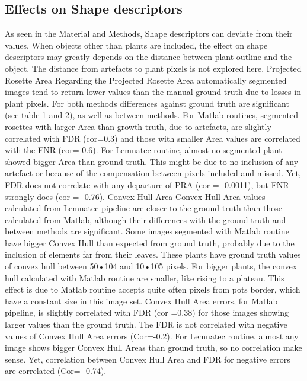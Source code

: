 \documentclass{frontiersSCNS} %
\begin{document}
\subsection{Effects on Shape descriptors}
As seen in the Material and Methods, Shape descriptors can deviate from their values. When objects other than plants are included, the effect on shape descriptors may greatly depends on the distance between plant outline and the object. The distance from artefacts to plant pixels is not explored here.
Projected Rosette Area
Regarding the Projected Rosette Area automatically segmented images tend to return lower values than the manual ground truth due to losses in plant pixels. For both methods differences against ground truth are significant (see table 1 and 2), as well as between methods. 
For Matlab routines, segmented rosettes with larger Area than growth truth, due to artefacts, are slightly correlated with FDR (cor=0.3) and those with smaller Area values are correlated with the FNR (cor=-0.6). For Lemnatec routine, almost no segmented plant showed bigger Area than ground truth. This might be due to no inclusion of any artefact or because of the compensation between pixels included and missed. Yet, FDR does not correlate with any departure of PRA (cor = -0.0011), but FNR strongly does (cor = -0.76).
Convex Hull Area
Convex Hull Area values calculated from Lemnatec pipeline are closer to the ground truth than those calculated from Matlab, although their differences with the ground truth and between methods are significant.
 Some images segmented with Matlab routine have bigger Convex Hull than expected from ground truth, probably due to the inclusion of elements far from their leaves. These plants have ground truth values of convex hull between 50•104 and 10•105 pixels. For bigger plants, the convex hull calculated with Matlab routine are smaller, like rising to a plateau. This effect is due to Matlab routine accepts quite often pixels from pots border, which have a constant size in this image set.
Convex Hull Area errors, for Matlab pipeline, is slightly correlated with FDR (cor =0.38) for those images showing larger values than the ground truth. The FDR is not correlated with negative values of Convex Hull Area errors (Cor=-0.2). For Lemnatec routine, almost any image shows bigger Convex Hull Areas than ground truth, so no correlation make sense. Yet, correlation between Convex Hull Area and FDR for negative errors are correlated (Cor= -0.74).
\end{document}
